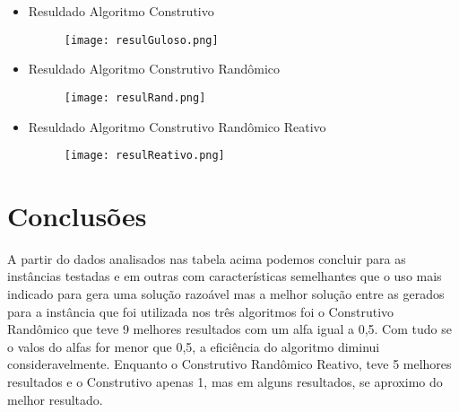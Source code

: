 \documentclass[12pt, fleqn]{article}
\begin{document}
      \begin{itemize}
	\item Resuldado Algoritmo Construtivo 
	\begin{figure}[!htpb]
	    \centering
	    \texttt{[image: resulGuloso.png]}
	\end{figure} 
	 \newpage
	\item Resuldado Algoritmo Construtivo Randômico
	\begin{figure}[!htpb]
	    \centering
	    \texttt{[image: resulRand.png]}
	\end{figure} 
	
	\item Resuldado Algoritmo Construtivo Randômico Reativo
	\begin{figure}[!htpb]
	    \centering
	    \texttt{[image: resulReativo.png]}
	\end{figure} 
      
      \end{itemize} 
    
     \newpage
    \section{Conclusões}
      \quad A partir do dados analisados nas tabela acima podemos concluir para as instâncias testadas e em outras com características semelhantes que o uso mais indicado  para gera uma solução razoável mas a melhor solução entre as  gerados para a instância que foi utilizada nos três algoritmos foi o Construtivo Randômico que teve 9 melhores resultados com um alfa igual a 0,5.
      Com tudo se o valos do alfas for menor que 0,5, a eficiência do algoritmo diminui consideravelmente. 
      Enquanto o Construtivo Randômico Reativo, teve 5 melhores resultados e o Construtivo apenas 1, mas em alguns resultados, se aproximo do melhor resultado.
    
    
\end{document}

